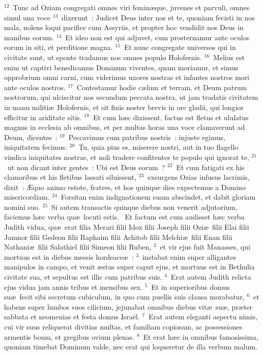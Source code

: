 ${}^{12}$~Tunc ad Oziam congregati omnes viri femin\ae que, juvenes et parvuli, omnes simul una voce
${}^{13}$~dixerunt~: Judicet Deus inter nos et te, quoniam fecisti in nos mala, nolens loqui pacifice cum Assyriis, et propter hoc vendidit nos Deus in manibus eorum.
${}^{14}$~Et ideo non est qui adjuvet, cum prosternamur ante oculos eorum in siti, et perditione magna.
${}^{15}$~Et nunc congregate universos qui in civitate sunt, ut sponte tradamus nos omnes populo Holofernis.
${}^{16}$~Melius est enim ut captivi benedicamus Dominum viventes, quam moriamur, et simus opprobrium omni carni, cum viderimus uxores nostras et infantes nostros mori ante oculos nostros.
${}^{17}$~Contestamur hodie c\ae lum et terram, et Deum patrum nostrorum, qui ulciscitur nos secundum peccata nostra, ut jam tradatis civitatem in manu militi\ae\ Holofernis, et sit finis noster brevis in ore gladii, qui longior efficitur in ariditate sitis.
${}^{18}$~Et cum h\ae c dixissent, factus est fletus et ululatus magnus in ecclesia ab omnibus, et per multas horas una voce clamaverunt ad Deum, dicentes~:
${}^{19}$~Peccavimus cum patribus nostris~: injuste egimus, iniquitatem fecimus.
${}^{20}$~Tu, quia pius es, miserere nostri, aut in tuo flagello vindica iniquitates nostras, et noli tradere confitentes te populo qui ignorat te,
${}^{21}$~ut non dicant inter gentes~: Ubi est Deus eorum~?
${}^{22}$~Et cum fatigati ex his clamoribus et his fletibus lassati siluissent,
${}^{23}$~exsurgens Ozias infusus lacrimis, dixit~: \AE quo animo estote, fratres, et hos quinque dies expectemus a Domino misericordiam.
${}^{24}$~Forsitan enim indignationem suam abscindet, et dabit gloriam nomini suo.
${}^{25}$~Si autem transactis quinque diebus non venerit adjutorium, faciemus h\ae c verba qu\ae\ locuti estis.
~Et factum est cum audisset h\ae c verba Judith vidua, qu\ae\ erat filia Merari filii Idox filii Joseph filii Ozi\ae\ filii Elai filii Jamnor filii Gedeon filii Raphaim filii Achitob filii Melchi\ae\ filii Enan filii Nathani\ae\ filii Salathiel filii Simeon filii Ruben,
${}^{2}$~et vir ejus fuit Manasses, qui mortuus est in diebus messis hordeace\ae~:
${}^{3}$~instabat enim super alligantes manipulos in campo, et venit \ae stus super caput ejus, et mortuus est in Bethulia civitate sua, et sepultus est illic cum patribus suis.
${}^{4}$~Erat autem Judith relicta ejus vidua jam annis tribus et mensibus sex.
${}^{5}$~Et in superioribus domus su\ae\ fecit sibi secretum cubiculum, in quo cum puellis suis clausa morabatur,
${}^{6}$~et habens super lumbos suos cilicium, jejunabat omnibus diebus vit\ae\ su\ae , pr\ae ter sabbata et neomenias et festa domus Isra\"el.
${}^{7}$~Erat autem eleganti aspectu nimis, cui vir suus reliquerat divitias multas, et familiam copiosam, ac possessiones armentis boum, et gregibus ovium plenas.
${}^{8}$~Et erat h\ae c in omnibus famosissima, quoniam timebat Dominum valde, nec erat qui loqueretur de illa verbum malum.


